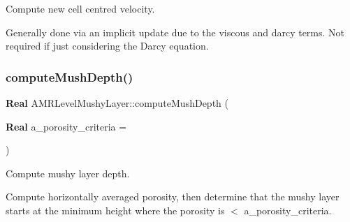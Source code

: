 Compute new cell centred velocity. 

Generally done via an implicit update due to the viscous and darcy terms. Not required if just considering the Darcy equation. \mbox{\label{class_a_m_r_level_mushy_layer_ab631de0d0116894c33286646a97eb395}} 
\subsubsection{\texorpdfstring{compute\+Mush\+Depth()}{computeMushDepth()}}
{\footnotesize\ttfamily \textbf{ Real} A\+M\+R\+Level\+Mushy\+Layer\+::compute\+Mush\+Depth (\begin{DoxyParamCaption}\item[{\textbf{ Real}}]{a\+\_\+porosity\+\_\+criteria = {} }\end{DoxyParamCaption})\hspace{0.3cm}{\ttfamily [protected]}}



Compute mushy layer depth. 

Compute horizontally averaged porosity, then determine that the mushy layer starts at the minimum height where the porosity is $<$ a\+\_\+porosity\+\_\+criteria. \mbox{\label{class_a_m_r_level_mushy_layer_a77914a8f6be67642c366b4da8e0a2829}} 
